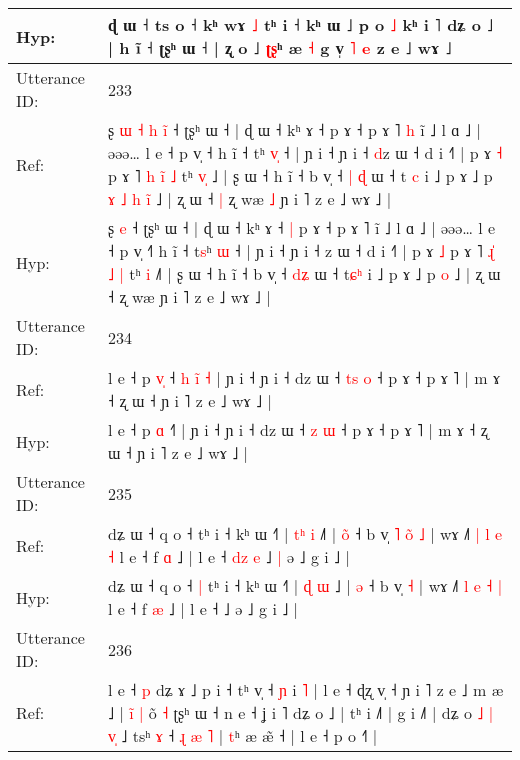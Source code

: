 \documentclass[10pt]{article}
\DeclareRobustCommand{\hl}[1]{{\textcolor{red}{#1}}}
\begin{document}
\begin{longtable}{ll}
 \\
Hyp: & ɖ ɯ ˧ ts o ˧ kʰ wɤ\hl{}\hl{} \hl{˩} tʰ i ˧ kʰ ɯ ˩\hl{}\hl{} p o \hl{˩} kʰ i ˥\hl{}\hl{} dʑ o ˩\hl{} | h ĩ ˧ ʈʂʰ ɯ ˧ | ʐ o ˩ \hl{ʈ}\hl{ʂ}ʰ\hl{}\hl{}\hl{}\hl{}\hl{}\hl{} æ \hl{˧} g v̩\hl{}\hl{}\hl{}\hl{} \hl{˥} \hl{e} z e ˩ wɤ ˩
 \\
\midrule
Utterance ID: & 233 \\
Ref: & ʂ\hl{ }\hl{ɯ}\hl{ }\hl{˧}\hl{ }\hl{h} \hl{i}\hl{̃} ˧ ʈʂʰ ɯ ˧ | ɖ ɯ ˧ kʰ ɤ ˧\hl{}\hl{} p ɤ ˧ p ɤ ˥\hl{ }\hl{h} ĩ ˩ l ɑ ˩ | əəə… l e ˧ p v̩ ˧\hl{} h ĩ ˧ t\hl{}ʰ \hl{v}\hl{̩} ˧ | ɲ i ˧ ɲ i ˧ \hl{d}z ɯ ˧ d i ˧˥ | p ɤ \hl{˧} p ɤ ˥ \hl{h}\hl{ }\hl{i}\hl{̃} \hl{˩} tʰ \hl{v}\hl{̩} ˩\hl{} | ʂ ɯ ˧ h ĩ ˧ b v̩ ˧ \hl{|}\hl{ }\hl{ɖ} ɯ ˧ t\hl{ }\hl{c} i ˩ p ɤ ˩ p\hl{ }\hl{ɤ}\hl{ }\hl{˩}\hl{ }\hl{h} \hl{i}\hl{̃} ˩ | ʐ ɯ ˧\hl{ }\hl{|} ʐ wæ\hl{ }\hl{˩} ɲ i ˥ z e ˩ wɤ ˩ |
 \\
Hyp: & ʂ\hl{}\hl{}\hl{}\hl{}\hl{}\hl{} \hl{}\hl{e} ˧ ʈʂʰ ɯ ˧ | ɖ ɯ ˧ kʰ ɤ ˧\hl{ }\hl{|} p ɤ ˧ p ɤ ˥\hl{}\hl{} ĩ ˩ l ɑ ˩ | əəə… l e ˧ p v̩ ˧\hl{˥} h ĩ ˧ t\hl{s}ʰ \hl{}\hl{ɯ} ˧ | ɲ i ˧ ɲ i ˧ \hl{}z ɯ ˧ d i ˧˥ | p ɤ \hl{˩} p ɤ ˥ \hl{ɻ}\hl{̍}\hl{ }\hl{˩} \hl{|} tʰ \hl{}\hl{i} ˩\hl{˥} | ʂ ɯ ˧ h ĩ ˧ b v̩ ˧ \hl{}\hl{d}\hl{ʑ} ɯ ˧ t\hl{ɕ}\hl{ʰ} i ˩ p ɤ ˩ p\hl{}\hl{}\hl{}\hl{}\hl{}\hl{} \hl{}\hl{o} ˩ | ʐ ɯ ˧\hl{}\hl{} ʐ wæ\hl{}\hl{} ɲ i ˥ z e ˩ wɤ ˩ |
 \\
\midrule
Utterance ID: & 234 \\
Ref: & l e ˧ p \hl{v}\hl{̩} ˧\hl{ }\hl{h}\hl{ }\hl{i}\hl{̃}\hl{ }\hl{˧} | ɲ i ˧ ɲ i ˧ dz ɯ ˧ \hl{t}\hl{s} \hl{o} ˧ p ɤ ˧ p ɤ ˥ | m ɤ ˧ ʐ ɯ ˧ ɲ i ˥ z e ˩ wɤ ˩ |
 \\
Hyp: & l e ˧ p \hl{}\hl{ɑ} ˧\hl{}\hl{}\hl{}\hl{}\hl{}\hl{}\hl{˥} | ɲ i ˧ ɲ i ˧ dz ɯ ˧ \hl{}\hl{z} \hl{ɯ} ˧ p ɤ ˧ p ɤ ˥ | m ɤ ˧ ʐ ɯ ˧ ɲ i ˥ z e ˩ wɤ ˩ |
 \\
\midrule
Utterance ID: & 235 \\
Ref: & dʑ ɯ ˧ q o ˧\hl{}\hl{} tʰ i ˧ kʰ ɯ ˧˥ | \hl{t}\hl{ʰ} \hl{i} ˩\hl{˥} | \hl{o}\hl{̃} ˧ b v̩\hl{ }\hl{˥}\hl{ }\hl{o}\hl{̃} \hl{˩} | wɤ ˩˥ \hl{|} \hl{l} \hl{e} \hl{˧} l e ˧ f \hl{ɑ} ˩ | l e ˧\hl{ }\hl{d}\hl{z}\hl{ }\hl{e} ˩\hl{ }\hl{|} ə ˩ g i ˩ |
 \\
Hyp: & dʑ ɯ ˧ q o ˧\hl{ }\hl{|} tʰ i ˧ kʰ ɯ ˧˥ | \hl{}\hl{ɖ} \hl{ɯ} ˩\hl{} | \hl{}\hl{ə} ˧ b v̩\hl{}\hl{}\hl{}\hl{}\hl{} \hl{˧} | wɤ ˩˥ \hl{l} \hl{e} \hl{˧} \hl{|} l e ˧ f \hl{æ} ˩ | l e ˧\hl{}\hl{}\hl{}\hl{}\hl{} ˩\hl{}\hl{} ə ˩ g i ˩ |
 \\
\midrule
Utterance ID: & 236 \\
Ref: & l e ˧ \hl{p} dʑ ɤ ˩ p i ˧ tʰ v̩ ˧\hl{} \hl{ɲ} i\hl{} \hl{˥} | l e ˧ ɖʐ v̩ ˧ ɲ i ˥ z e ˩ m æ ˩ | \hl{i}\hl{̃}\hl{ }\hl{|} õ\hl{ }\hl{˧} ʈʂʰ ɯ ˧ n e ˧ ʝ i ˥ dʑ o ˩ | tʰ i ˩˥ | g i ˩˥ | dʑ o\hl{ }\hl{˩}\hl{ }\hl{|}\hl{ }\hl{v}\hl{̩} ˩ tsʰ \hl{ɤ} ˧ \hl{ɻ} \hl{æ} \hl{˥} | \hl{t}ʰ æ æ̃ ˧ | l e ˧ p\hl{} o ˧˥ |

\end{longtable}
\end{document}
